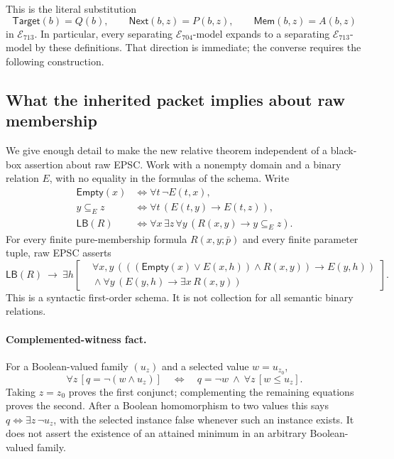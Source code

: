 This is the literal substitution
\begin{equation}
 \mathsf{Target}(b)=Q(b),\qquad
 \mathsf{Next}(b,z)=P(b,z),\qquad
 \mathsf{Mem}(b,z)=A(b,z)
 \label{eq:704-aliases}
\end{equation}
in $\mathcal E_{713}$.  In particular, every separating
$\mathcal E_{704}$-model expands to a separating
$\mathcal E_{713}$-model by these definitions.  That direction is
immediate; the converse requires the following construction.

\subsection{What the inherited packet implies about raw membership}

We give enough detail to make the new relative theorem independent of
a black-box assertion about raw EPSC.  Work with a nonempty domain and
a binary relation $E$, with no equality in the formulas of the schema.
Write
\begin{align*}
 \mathsf{Empty}(x)&\iff\forall t\,\neg E(t,x),\\
 y\subseteq_E z&\iff\forall t\,(E(t,y)\to E(t,z)),\\
 \mathsf{LB}(R)&\iff
       \forall x\,\exists z\,\forall y\,(R(x,y)\to y\subseteq_E z).
\end{align*}
For every finite pure-membership formula $R(x,y;\bar p)$ and every
finite parameter tuple, raw EPSC asserts
\begin{equation}
 \mathsf{LB}(R)\ \longrightarrow\
 \exists h\left[
   \begin{aligned}
   &\forall x,y\,
     (((\mathsf{Empty}(x)\lor E(x,h))\land R(x,y))\to E(y,h))\\[-1mm]
   &{}\land\forall y\,(E(y,h)\to\exists x\,R(x,y))
   \end{aligned}\right].
 \label{eq:704-epsc}
\end{equation}
This is a syntactic first-order schema.  It is not collection for all
semantic binary relations.

\paragraph{Complemented-witness fact.}
For a Boolean-valued family $(u_z)$ and a selected value $w=u_{z_0}$,
\[
 \forall z\,[q=\neg(w\wedge u_z)]
 \quad\Longleftrightarrow\quad
 q=\neg w\ \land\ \forall z\,[w\leq u_z].
\]
Taking $z=z_0$ proves the first conjunct; complementing the remaining
equations proves the second.  After a Boolean homomorphism to two
values this says $q\iff\exists z\,\neg u_z$, with the selected
instance false whenever such an instance exists.  It does not assert
the existence of an attained minimum in an arbitrary Boolean-valued
family.

